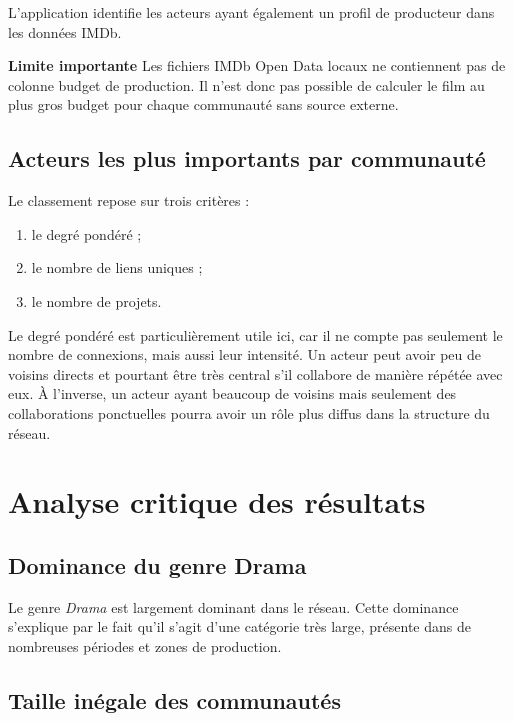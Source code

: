 \documentclass[a4paper,12pt]{article}
\begin{document}
L'application identifie les acteurs ayant également un profil de producteur dans les données IMDb.

\begin{tcolorbox}[warnbox]
\textbf{Limite importante}
Les fichiers IMDb Open Data locaux ne contiennent pas de colonne budget de production. Il n'est donc pas possible de calculer le film au plus gros budget pour chaque communauté sans source externe.
\end{tcolorbox}

\subsection{Acteurs les plus importants par communauté}

Le classement repose sur trois critères :
\begin{enumerate}[leftmargin=1.4cm, itemsep=2pt]
  \item le degré pondéré ;
  \item le nombre de liens uniques ;
  \item le nombre de projets.
\end{enumerate}

Le degré pondéré est particulièrement utile ici, car il ne compte pas seulement le nombre de connexions, mais aussi leur intensité. Un acteur peut avoir peu de voisins directs et pourtant être très central s'il collabore de manière répétée avec eux. À l'inverse, un acteur ayant beaucoup de voisins mais seulement des collaborations ponctuelles pourra avoir un rôle plus diffus dans la structure du réseau.

\section{Analyse critique des résultats}

\subsection{Dominance du genre Drama}

Le genre \textit{Drama} est largement dominant dans le réseau. Cette dominance s'explique par le fait qu'il s'agit d'une catégorie très large, présente dans de nombreuses périodes et zones de production.

\subsection{Taille inégale des communautés}
\end{document}
